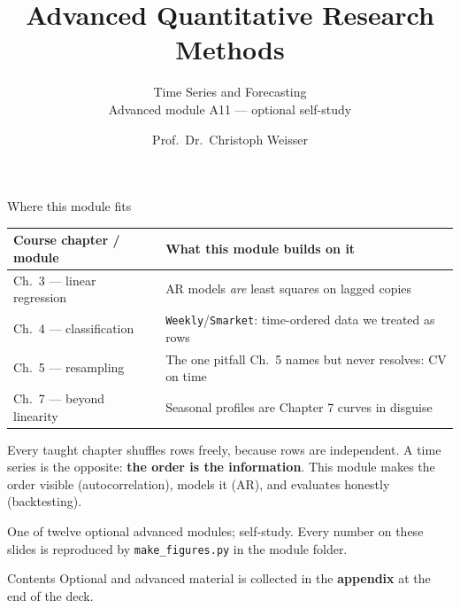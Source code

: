 \documentclass[aspectratio=169,11pt]{beamer}
\title{Advanced Quantitative Research Methods}
\subtitle{Time Series and Forecasting\\[2pt]{\small Advanced module A11 --- optional self-study}}
\author{Prof.\ Dr.\ Christoph Weisser}
\date{}\graphicspath{{images/}}
\begin{document}
\begin{frame}[plain]\titlepage\end{frame}

\begin{frame}{Where this module fits}
  \footnotesize
  \begin{center}
  \begin{tabular}{@{}p{3.9cm}p{8.4cm}@{}}
    \toprule
    \textbf{Course chapter / module} & \textbf{What this module builds on it} \\
    \midrule
    Ch.\ 3 --- linear regression & AR models \emph{are} least squares on lagged copies \\
    Ch.\ 4 --- classification & \texttt{Weekly}/\texttt{Smarket}: time-ordered data we treated as rows \\
    Ch.\ 5 --- resampling & The one pitfall Ch.\ 5 names but never resolves: CV on time \\
    Ch.\ 7 --- beyond linearity & Seasonal profiles are Chapter 7 curves in disguise \\
    \bottomrule
  \end{tabular}
  \end{center}
  \vspace{2pt}
  \begin{takeaway}
    Every taught chapter shuffles rows freely, because rows are independent. A time
    series is the opposite: \textbf{the order is the information}. This module makes
    the order visible (autocorrelation), models it (AR), and evaluates honestly
    (backtesting).
  \end{takeaway}
  {\scriptsize One of twelve optional advanced modules; self-study. Every number on
  these slides is reproduced by \texttt{make\_figures.py} in the module folder.}
\end{frame}

\begin{frame}{Contents}\small\tableofcontents[hideallsubsections]
  \vfill
  {\tiny Optional and advanced material is collected in the \textbf{appendix} at the end of the deck.}
\end{frame}
\end{document}
